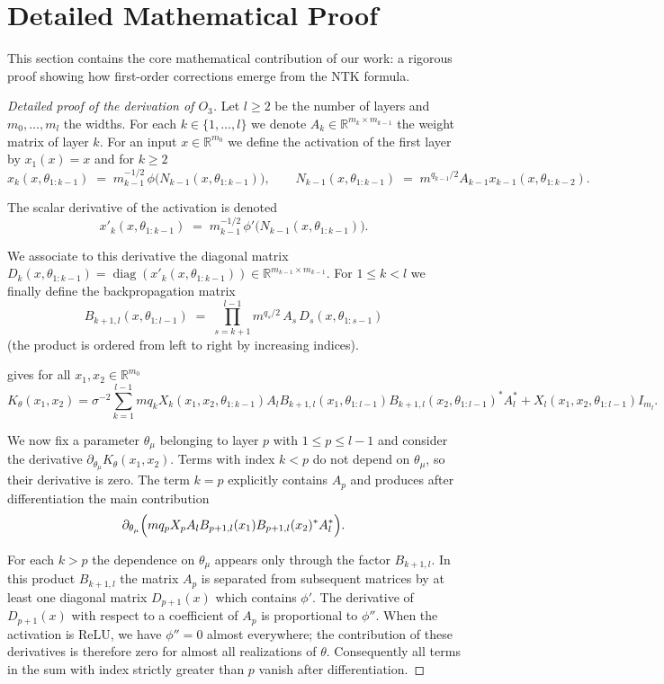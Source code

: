 \documentclass[11pt,a4paper]{article}
\theoremstyle{definition}
\begin{document}
\newpage

\section{Detailed Mathematical Proof}

This section contains the core mathematical contribution of our work: a rigorous proof showing how first-order corrections emerge from the NTK formula.

\begin{proof}[Detailed proof of the derivation of $O_3$]\label{proof:main}
Let $l \ge 2$ be the number of layers and $m_0,\dots ,m_l$ the widths. For each $k\in\{1,\dots ,l\}$ we denote $A_k\in \mathbb R^{m_k\times m_{k-1}}$ the weight matrix of layer $k$. For an input $x\in\mathbb R^{m_0}$ we define the activation of the first layer by $x_1(x)=x$ and for $k\ge 2$
\[
 x_k(x,\theta_{1:k-1})\;=\;m_{k-1}^{-1/2}\,\phi\bigl(N_{k-1}(x,\theta_{1:k-1})\bigr),\qquad N_{k-1}(x,\theta_{1:k-1})\;=\;m^{q_{k-1}/2}A_{k-1}x_{k-1}(x,\theta_{1:k-2}).
\]

The scalar derivative of the activation is denoted
\[
 x'_k(x,\theta_{1:k-1})\;=\;m_{k-1}^{-1/2}\,\phi'\bigl(N_{k-1}(x,\theta_{1:k-1})\bigr).
\]

We associate to this derivative the diagonal matrix $D_k(x,\theta_{1:k-1})=\operatorname{diag}(x'_k(x,\theta_{1:k-1}))\in \mathbb R^{m_{k-1}\times m_{k-1}}$. For $1\le k<l$ we finally define the backpropagation matrix
\[
 B_{k+1,l}(x,\theta_{1:l-1})\;=\;\prod_{s=k+1}^{l-1} m^{q_s/2}\,A_s\,D_{s}(x,\theta_{1:s-1})
\]
(the product is ordered from left to right by increasing indices).

 gives for all $x_1,x_2\in\mathbb R^{m_0}$
\[
 K_{\theta}(x_1,x_2)=\sigma^{-2}\sum_{k=1}^{l-1}m q_k X_k(x_1,x_2,\theta_{1:k-1})A_l B_{k+1,l}(x_1,\theta_{1:l-1})B_{k+1,l}(x_2,\theta_{1:l-1})^{*}A_l^{*}+X_l(x_1,x_2,\theta_{1:l-1})I_{m_l}.
\]

We now fix a parameter $\theta_{\mu}$ belonging to layer $p$ with $1\le p\le l-1$ and consider the derivative $\partial_{\theta_{\mu}}K_{\theta}(x_1,x_2)$. Terms with index $k<p$ do not depend on $\theta_{\mu}$, so their derivative is zero. The term $k=p$ explicitly contains $A_p$ and produces after differentiation the main contribution
\[
 \partial_{\theta_{\mu}}\Bigl(m q_p X_p A_l B_{p+1,l}(x_1)B_{p+1,l}(x_2)^{*}A_l^{*}\Bigr).
\]

For each $k>p$ the dependence on $\theta_{\mu}$ appears only through the factor $B_{k+1,l}$. In this product $B_{k+1,l}$ the matrix $A_p$ is separated from subsequent matrices by at least one diagonal matrix $D_{p+1}(x)$ which contains $\phi'$. The derivative of $D_{p+1}(x)$ with respect to a coefficient of $A_p$ is proportional to $\phi''$. When the activation is ReLU, we have $\phi''=0$ almost everywhere; the contribution of these derivatives is therefore zero for almost all realizations of $\theta$. Consequently all terms in the sum with index strictly greater than $p$ vanish after differentiation.


\end{proof}
\end{document}

